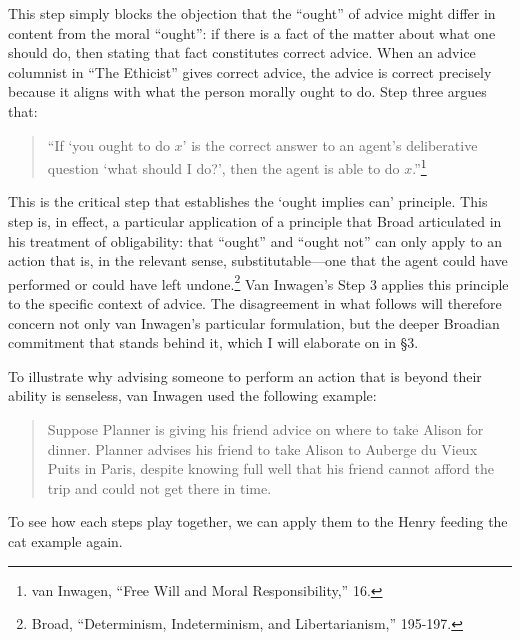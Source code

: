 \noindent This step simply blocks the objection that the ``ought'' of advice might
differ in content from the moral ``ought'': if there is a fact of the
matter about what one should do, then stating that fact constitutes
correct advice. When an advice columnist in ``The Ethicist'' gives
correct advice, the advice is correct precisely because it aligns with
what the person morally ought to do. Step three argues that:

\vspace{-1em}
\begin{quote}
``If `you ought to do $x$' is the correct answer to an agent's
deliberative question `what should I do?', then the agent is able to do
$x$.''\footnote{van Inwagen, ``Free Will and Moral Responsibility,''
  16.}
\end{quote}

\noindent This is the critical step that establishes the `ought implies can'
principle. This step is, in effect, a particular application of a
principle that Broad articulated in his treatment of obligability: that
``ought'' and ``ought not'' can only apply to an action that is, in the
relevant sense, substitutable---one that the agent could have
performed or could have left undone.\footnote{Broad, ``Determinism,
  Indeterminism, and Libertarianism,'' 195-197.} Van Inwagen's Step 3
applies this principle to the specific context of advice. The
disagreement in what follows will therefore concern not only van
Inwagen's particular formulation, but the deeper Broadian commitment
that stands behind it, which I will elaborate on in §3.

To illustrate why advising someone to perform an action that is beyond
their ability is senseless, van Inwagen used the following example:

\vspace{-1em}
\begin{quote}
Suppose Planner is giving his friend advice on where to take Alison for
dinner. Planner advises his friend to take Alison to Auberge du Vieux
Puits in Paris, despite knowing full well that his friend cannot afford
the trip and could not get there in time.
\end{quote}

\noindent To see how each steps play together, we can apply them to the Henry
feeding the cat example again.


